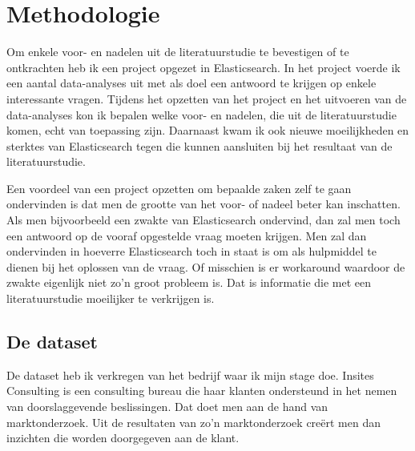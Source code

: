 
\chapter{Methodologie}
\label{ch:methodologie}


Om enkele voor- en nadelen uit de literatuurstudie te bevestigen of te ontkrachten heb ik een project opgezet in Elasticsearch. In het project voerde ik een aantal data-analyses uit met als doel een antwoord te krijgen op enkele interessante vragen. Tijdens het opzetten van het project en het uitvoeren van de data-analyses kon ik bepalen welke voor- en nadelen, die uit de literatuurstudie komen, echt van toepassing zijn. Daarnaast kwam ik ook nieuwe moeilijkheden en sterktes van Elasticsearch tegen die kunnen aansluiten bij het resultaat van de literatuurstudie.

Een voordeel van een project opzetten om bepaalde zaken zelf te gaan ondervinden is dat men de grootte van het voor- of nadeel beter kan inschatten. Als men bijvoorbeeld een zwakte van Elasticsearch ondervind, dan zal men toch een antwoord op de vooraf opgestelde vraag moeten krijgen. Men zal dan ondervinden in hoeverre Elasticsearch toch in staat is om als hulpmiddel te dienen bij het oplossen van de vraag. Of misschien is er workaround waardoor de zwakte eigenlijk niet zo'n groot probleem is. Dat is informatie die met een literatuurstudie moeilijker te verkrijgen is.

\section{De dataset}
De dataset heb ik verkregen van het bedrijf waar ik mijn stage doe. Insites Consulting is een consulting bureau die haar klanten ondersteund in het nemen van doorslaggevende beslissingen. Dat doet men aan de hand van marktonderzoek. Uit de resultaten van zo'n marktonderzoek creërt men dan inzichten die worden doorgegeven aan de klant. 

